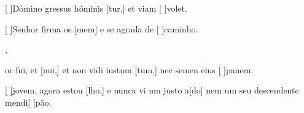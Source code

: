 {  %
  {\item {}[ ]{Dó}mino gressus hóminis [tur,] et viam [ ]{vo}let.~\Antiphona}%
    {\item {}[ ]{Se}nhor firma os [mem] e se agrada de [ ]{ca}{mi}nho.~\Antiphona},
  {\item {}or fui, et [nui,] et non vidi iustum [tum,] nec semen eius [ ]{pa}nem.~\Antiphona}%
    {\item {}[ ]{jo}vem, agora estou [lho,] e nunca vi um justo a[do] nem um seu descendente mendi[ ]{pão}.~\Antiphona}
}